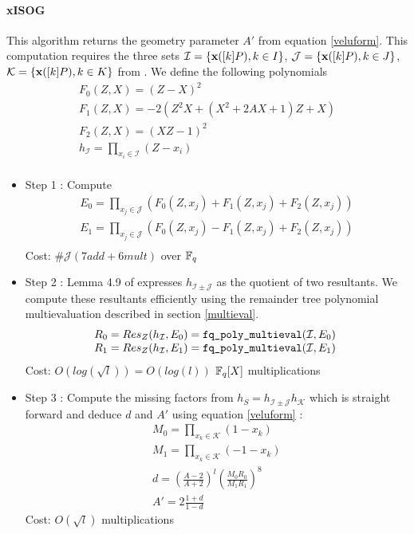 \documentclass[../main.tex]{subfilesubs}
\begin{document}
\paragraph{xISOG} This algorithm returns the geometry parameter $A'$ from equation \eqref{veluform}. This computation requires the three sets $\mathcal{I}=\{\textbf{x}([k]P), k\in I\}$, $\mathcal{J}=\{\textbf{x}([k]P), k\in J\}$, $\mathcal{K}=\{\textbf{x}([k]P), k\in K\}$ from .
We define the following polynomials \[\begin{array}{l}
	F_0(Z,X)=(Z-X)^2\\
	F_1(Z,X)=-2(Z^2X+(X^2+2AX+1)Z+X)\\
	F_2(Z,X)=(XZ-1)^2\\
	h_\mathcal{I}=\prod_{x_i\in\mathcal{I}}(Z-x_i)\\
\end{array}\]
\begin{itemize}
\item Step 1 : Compute \[\begin{array}{l}
	E_0 = \prod_{x_j\in\mathcal{J}}(F_0(Z,x_j)+F_1(Z,x_j)+F_2(Z,x_j))\\
	E_1 = \prod_{x_j\in\mathcal{J}}(F_0(Z,x_j)-F_1(Z,x_j)+F_2(Z,x_j))\\
\end{array}\]
Cost: $\#\mathcal{J}(7add+6mult)$ over $\mathbb{F}_q$
\item Step 2 : Lemma 4.9 of \cite{} expresses $h_{\mathcal{I}\pm \mathcal{J}}$ as the quotient of two resultants. We compute these resultants efficiently using the remainder tree polynomial multievaluation  described in section \ref{multieval}.
\[\begin{array}{l}
	R_0 = Res_Z(h_\mathcal{I},E_0) = \funct{fq_poly_multieval}(\mathcal{I}, E_0)\\
	R_1 = Res_Z(h_\mathcal{I},E_1) = \funct{fq_poly_multieval}(\mathcal{I}, E_1)\
\end{array}\]
Cost: $O(log(\sqrt{l}))=O(log(l))$ $\mathbb{F}_q[X]$ multiplications
\item Step 3 : Compute the missing factors from $h_S=h_{\mathcal{I}\pm \mathcal{J}}h_\mathcal{K}$ which is straight forward and deduce $d$ and $A'$ using equation \eqref{veluform} :
 \[\begin{array}{l}
	M_0 = \prod_{x_k\in\mathcal{K}}(1-x_k)\\
	M_1 = \prod_{x_k\in\mathcal{K}}(-1-x_k)\\
	d = \left(\frac{A-2}{A+2}\right)^l \left( \frac{M_0R_0}{M_1R_1}\right)^8\\
	A'=2\frac{1+d}{1-d}
 \end{array}\]
Cost: $O(\sqrt{l})$ multiplications
\end{itemize}
\end{document}
